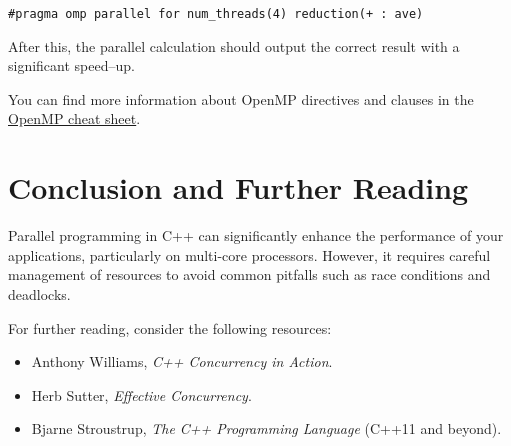 \documentclass{article}
\begin{document}
\begin{verbatim}
#pragma omp parallel for num_threads(4) reduction(+ : ave)
\end{verbatim}

After this, the parallel calculation should output the correct result with a significant speed--up.

You can find more information about OpenMP directives and clauses in the \href{https://www.openmp.org/wp-content/uploads/OpenMP3.1-CCard.pdf}{OpenMP cheat sheet}.


\section{Conclusion and Further Reading}
Parallel programming in C++ can significantly enhance the performance of your applications, particularly on multi-core processors. However, it requires careful management of resources to avoid common pitfalls such as race conditions and deadlocks.

For further reading, consider the following resources:
\begin{itemize}
    \item Anthony Williams, \textit{C++ Concurrency in Action}.
    \item Herb Sutter, \textit{Effective Concurrency}.
    \item Bjarne Stroustrup, \textit{The C++ Programming Language} (C++11 and beyond).
\end{itemize}
\end{document}

